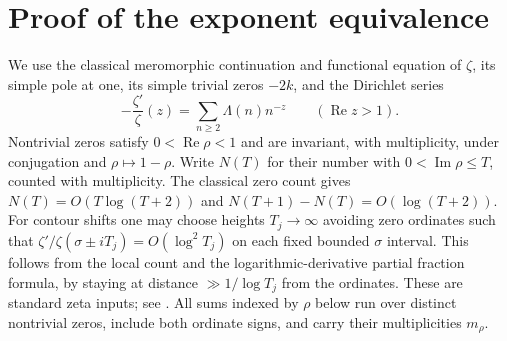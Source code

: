 \documentclass[11pt]{article}
\theoremstyle{remark}
\newcommand{\Rea}{\operatorname{Re}}
\newcommand{\Ima}{\operatorname{Im}}
\numberwithin{equation}{section}
\begin{document}
\section{Proof of the exponent equivalence}\label{sec:equivalence}
We use the classical meromorphic continuation and functional equation of
$\zeta$, its simple pole at one, its simple trivial zeros $-2k$,
and the Dirichlet series
\begin{equation}\label{eq:dirichlet}
-\frac{\zeta'}{\zeta}(z)=\sum_{n\ge2}\Lambda(n)n^{-z}
\qquad(\Rea z>1).
\end{equation}
Nontrivial zeros satisfy $0<\Rea\rho<1$ and are invariant, with
multiplicity, under conjugation and $\rho\mapsto1-\rho$.
Write $N(T)$ for their number with $0<\Ima\rho\le T$, counted with
multiplicity. The classical zero count gives
$N(T)=O(T\log(T+2))$ and $N(T+1)-N(T)=O(\log(T+2))$.
For contour shifts one may choose heights $T_j\to\infty$ avoiding zero
ordinates such that $\zeta'/\zeta(\sigma\pm iT_j)=O(\log^2T_j)$ on
each fixed bounded $\sigma$ interval. This follows from the local count
and the logarithmic-derivative partial fraction formula, by staying
at distance $\gg1/\log T_j$ from the ordinates. These are standard
zeta inputs; see \cite{DLMF,ExplicitFormula,HSW}.
All sums indexed by $\rho$ below run over distinct nontrivial zeros,
include both ordinate signs, and carry their multiplicities $m_\rho$.
\end{document}
